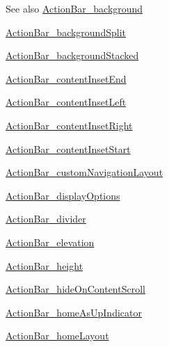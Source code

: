 \begin{DoxySeeAlso}{See also}
\hyperlink{classandroid_1_1support_1_1v4_1_1R_1_1styleable_a94adf52e3aef74eee3f46cc8699d6d08}{Action\+Bar\+\_\+background} 

\hyperlink{classandroid_1_1support_1_1v4_1_1R_1_1styleable_a13fc4682aff98cabdb455b8d50537f59}{Action\+Bar\+\_\+background\+Split} 

\hyperlink{classandroid_1_1support_1_1v4_1_1R_1_1styleable_aacf7d90f6edcba30a3c2043eec5cef02}{Action\+Bar\+\_\+background\+Stacked} 

\hyperlink{classandroid_1_1support_1_1v4_1_1R_1_1styleable_a8c18998b9778b47903b01c995bc228dd}{Action\+Bar\+\_\+content\+Inset\+End} 

\hyperlink{classandroid_1_1support_1_1v4_1_1R_1_1styleable_acb50a5936c9ea41ae3f8e43860a37a11}{Action\+Bar\+\_\+content\+Inset\+Left} 

\hyperlink{classandroid_1_1support_1_1v4_1_1R_1_1styleable_a3bef2a0708d9a976e79efa23e5327187}{Action\+Bar\+\_\+content\+Inset\+Right} 

\hyperlink{classandroid_1_1support_1_1v4_1_1R_1_1styleable_a8c36e247399bd81da6f4808194dd4df8}{Action\+Bar\+\_\+content\+Inset\+Start} 

\hyperlink{classandroid_1_1support_1_1v4_1_1R_1_1styleable_a1ea53c5c11ad0d5f6a9a592da14f2b64}{Action\+Bar\+\_\+custom\+Navigation\+Layout} 

\hyperlink{classandroid_1_1support_1_1v4_1_1R_1_1styleable_a777891bdb003968579bc757b1781ca24}{Action\+Bar\+\_\+display\+Options} 

\hyperlink{classandroid_1_1support_1_1v4_1_1R_1_1styleable_ac3707487601420af47218613124bf864}{Action\+Bar\+\_\+divider} 

\hyperlink{classandroid_1_1support_1_1v4_1_1R_1_1styleable_af9188f37272bce5af588009089023764}{Action\+Bar\+\_\+elevation} 

\hyperlink{classandroid_1_1support_1_1v4_1_1R_1_1styleable_a96d9c1a905653113d5071864c6cabc6f}{Action\+Bar\+\_\+height} 

\hyperlink{classandroid_1_1support_1_1v4_1_1R_1_1styleable_a34d5eac32f5d297f42d6d9d3a885891b}{Action\+Bar\+\_\+hide\+On\+Content\+Scroll} 

\hyperlink{classandroid_1_1support_1_1v4_1_1R_1_1styleable_afcf7f4cdfdc06edf00b3dde2479d7702}{Action\+Bar\+\_\+home\+As\+Up\+Indicator} 

\hyperlink{classandroid_1_1support_1_1v4_1_1R_1_1styleable_abb8398bbec7921fb6596d6de854eb0cc}{Action\+Bar\+\_\+home\+Layout} 


\end{DoxySeeAlso}
